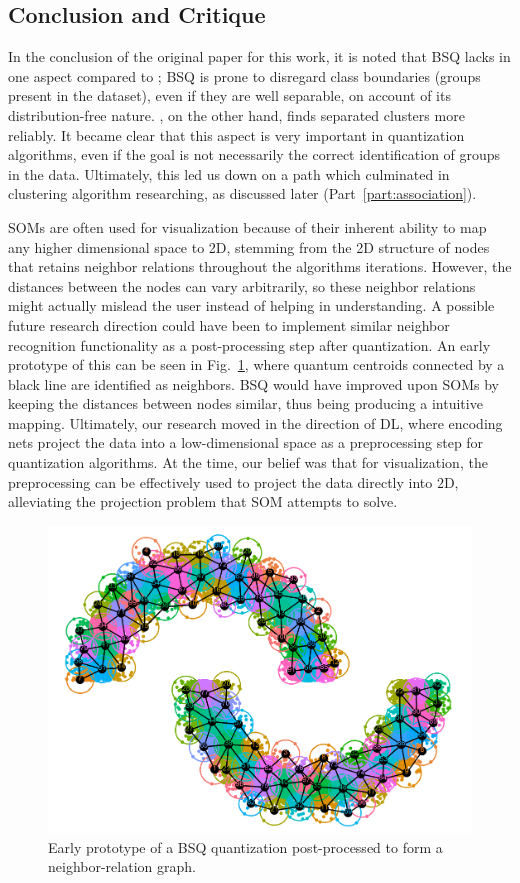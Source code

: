 		\subsection{Conclusion and Critique}
		
			In the conclusion of the original paper for this work, it is noted that \ac{BSQ} lacks in one aspect compared to \kmeans{}; \ac{BSQ} is prone to disregard class boundaries (groups present in the dataset), even if they are well separable, on account of its distribution-free nature.
			\kmeans{}, on the other hand, finds separated clusters more reliably.
			It became clear that this aspect is very important in quantization algorithms, even if the goal is not necessarily the correct identification of groups in the data.
			Ultimately, this led us down on a path which culminated in clustering algorithm researching, as discussed later (Part~\ref{part:association}).
			
			\acp{SOM} are often used for visualization because of their inherent ability to map any higher dimensional space to 2D, stemming from the 2D structure of nodes that retains neighbor relations throughout the algorithms iterations.
			However, the distances between the nodes can vary arbitrarily, so these neighbor relations might actually mislead the user instead of helping in understanding.
			A possible future research direction could have been to implement similar neighbor recognition functionality as a post-processing step after quantization.
			An early prototype of this can be seen in Fig.~\ref{fig:map_bsq}, where quantum centroids connected by a black line are identified as neighbors.
			\ac{BSQ} would have improved upon \acp{SOM} by keeping the distances between nodes similar, thus being producing a intuitive mapping.
			Ultimately, our research moved in the direction of \ac{DL}, where encoding nets project the data into a low-dimensional space as a preprocessing step for quantization algorithms.
			At the time, our belief was that for visualization, the preprocessing can be effectively used to project the data directly into $2$D, alleviating the projection problem that \ac{SOM} attempts to solve.
			
			\begin{figure}[ht]
				\centering
				\includegraphics[width=0.6\linewidth]{figures/03_quantization/map_bsq/map_bsq.png}
				\caption[BSQ super-cluster prototype]{Early prototype of a BSQ quantization post-processed to form a neighbor-relation graph.}
				\label{fig:map_bsq}
			\end{figure}
			
